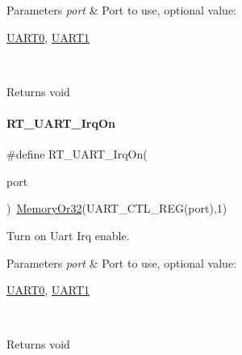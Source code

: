 \begin{DoxyParams}{Parameters}
{\em port} & Port to use, optional value\+:
\begin{DoxyCode}
\mbox{\hyperlink{a00173_a0508661f121639ffdee7de2353a0def2}{UART0}}, \mbox{\hyperlink{a00173_a8d69bf04d07af4fbbab5a8bd291f65ff}{UART1}}
\end{DoxyCode}
 \\
\hline
\end{DoxyParams}
\begin{DoxyReturn}{Returns}
void 
\end{DoxyReturn}
\mbox{\label{a00173_a5ed058b5d506df45c51358b8451550ad}} 
\paragraph{\texorpdfstring{R\+T\+\_\+\+U\+A\+R\+T\+\_\+\+Irq\+On}{RT\_UART\_IrqOn}}
{\footnotesize\ttfamily \#define R\+T\+\_\+\+U\+A\+R\+T\+\_\+\+Irq\+On(\begin{DoxyParamCaption}\item[{}]{port }\end{DoxyParamCaption})~\mbox{\hyperlink{a00068_a27874a97deab7cecdde5ddecf466e31e}{Memory\+Or32}}(U\+A\+R\+T\+\_\+\+C\+T\+L\+\_\+\+R\+EG(port),1)}



Turn on Uart Irq enable. 


\begin{DoxyParams}{Parameters}
{\em port} & Port to use, optional value\+:
\begin{DoxyCode}
\mbox{\hyperlink{a00173_a0508661f121639ffdee7de2353a0def2}{UART0}}, \mbox{\hyperlink{a00173_a8d69bf04d07af4fbbab5a8bd291f65ff}{UART1}}
\end{DoxyCode}
 \\
\hline
\end{DoxyParams}
\begin{DoxyReturn}{Returns}
void 
\end{DoxyReturn}
\mbox{\label{a00173_a9e7d98206f07485a3347bab6672a971c}} 
